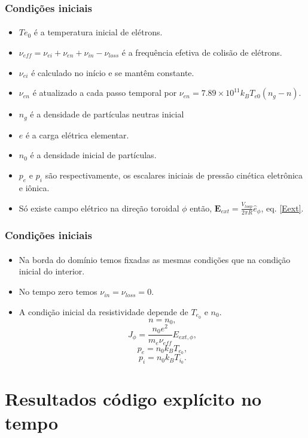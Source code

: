 \documentclass[aspectratio=169]{beamer}
\begin{document}
\begin{frame}		
\frametitle{Condições iniciais}
\framesubtitle{ }
\begin{itemize}
\item $Te_0$ é a temperatura inicial de elétrons.
\item $\nu_{eff}=\nu_{ei} + \nu_{en} + \nu_{in} - \nu_{loss}$ é a frequência efetiva de colisão de elétrons.
\item $\nu_{ei}$ é calculado no início e se mantêm constante. 
\item $\nu_{en}$ é atualizado a cada passo temporal por $\nu_{en}=7.89 \times 10^{11} k_B T_{e0}(n_g-n)$. \item $n_g$ é a densidade de partículas neutras inicial 
\item $e$ é a carga elétrica elementar. 
\item $n_0$ é a densidade inicial de partículas.
\item  $p_e$ e $p_i$ são respectivamente, os escalares iniciais de pressão cinética eletrônica e iônica. 
\item Só existe campo elétrico na direção toroidal $\phi$ então, $\bm{E}_{ext} = \frac{V_{loop}}{2\pi R} \hat{e}_{\phi} $, eq. \ref{Eext}. 
\end{itemize}

\end{frame}
\begin{frame}		
\frametitle{Condições iniciais}
\framesubtitle{ } 
\begin{itemize}

\item Na borda do domínio temos fixadas as mesmas condições que na condição inicial do interior.
\item No tempo zero temos $\nu_{in} = \nu_{loss} = 0$. %
\item A condição inicial da resistividade depende de $T_{e_0}$ e $n_0$. %
$$n = n_0,$$
$$J_{\phi}= \frac{n_0 e^2 }{m_e \nu_{eff}} E_{ext,\phi},$$
$$p_e=n_0 k_B T_{e_0},$$
$$p_i=n_0 k_B T_{i_0}. $$
\end{itemize}
\end{frame}


\section{Resultados código explícito no tempo}
\end{document}
